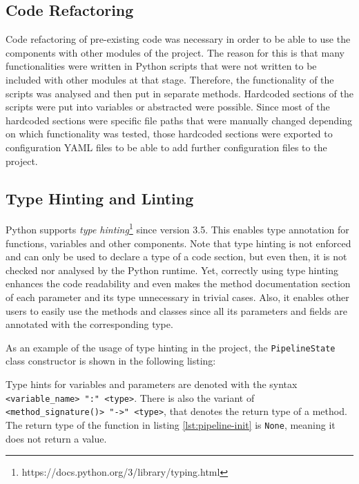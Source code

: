 \documentclass{article}
\begin{document}
    \subsection{Code Refactoring}
    \label{sec:code-refactoring-code-quality}

        Code refactoring of pre-existing code was necessary in order to be able to use the components with other modules of the project.
        The reason for this is that many functionalities were written in Python scripts that were not written to be included with other modules at that stage.
        Therefore, the functionality of the scripts was analysed and then put in separate methods.
        Hardcoded sections of the scripts were put into variables or abstracted were possible. 
        Since most of the hardcoded sections were specific file paths that were manually changed depending on which functionality was tested, those hardcoded sections were exported to configuration YAML files to be able to add further configuration files to the project.


    \subsection{Type Hinting and Linting}
    \label{sec:type-hinting-code-quality}

        Python supports \emph{type hinting}\footnote{https://docs.python.org/3/library/typing.html} since version 3.5.
        This enables type annotation for functions, variables and other components.
        Note that type hinting is not enforced and can only be used to declare a type of a code section, but even then, it is not checked nor analysed by the Python runtime.
        Yet, correctly using type hinting enhances the code readability and even makes the method documentation section of each parameter and its type unnecessary in trivial cases. Also, it enables other users to easily use the methods and classes since all its parameters and fields are annotated with the corresponding type.

        As an example of the usage of type hinting in the project, the \texttt{PipelineState} class constructor is shown in the following listing:
        
        Type hints for variables and parameters are denoted with the syntax \texttt{<variable\_name> ":" <type>}.
        There is also the variant of \texttt{<method\_signature()> "->" <type>}, that denotes the return type of a method.
        The return type of the function in listing \ref{lst:pipeline-init} is \texttt{None}, meaning it does not return a value.
\end{document}
